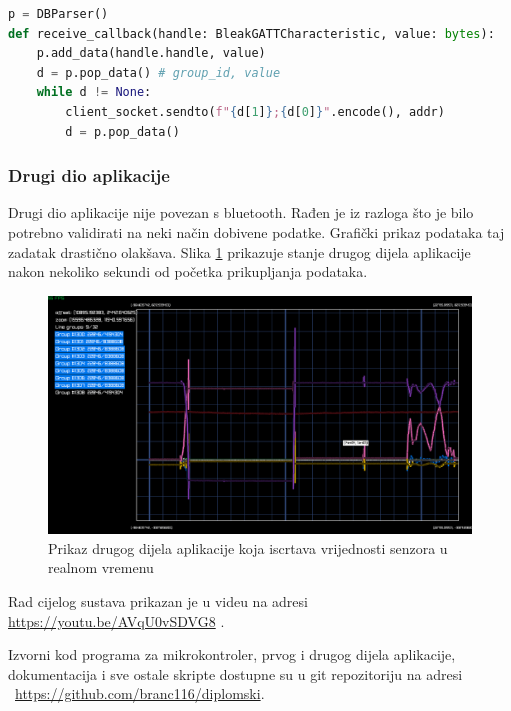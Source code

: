 \documentclass[times, utf8, diplomski]{diplomski}
\begin{document}
\begin{lstlisting}[language=python, caption={Prosljeđivanje dobivene bluetooth vrijednosti drugom dijelu aplikacije}, label={relay}]
p = DBParser()
def receive_callback(handle: BleakGATTCharacteristic, value: bytes):
    p.add_data(handle.handle, value)
    d = p.pop_data() # group_id, value 
    while d != None:
        client_socket.sendto(f"{d[1]};{d[0]}".encode(), addr)
        d = p.pop_data()
\end{lstlisting}

\subsubsection{Drugi dio aplikacije}
Drugi dio aplikacije nije povezan s bluetooth. Rađen je iz razloga što je bilo potrebno validirati na neki način dobivene podatke. Grafički prikaz podataka taj zadatak drastično olakšava. Slika \ref{fig:graph} prikazuje stanje drugog dijela aplikacije nakon nekoliko sekundi od početka prikupljanja podataka. 

\begin{figure}[H]
\includegraphics[width=\textwidth]{rlplot_allsensors_20230623_120537.png}
\centering
\caption{Prikaz drugog dijela aplikacije koja iscrtava vrijednosti senzora u realnom vremenu}
\label{fig:graph}
\end{figure}

Rad cijelog sustava prikazan je u videu na adresi \url{https://youtu.be/AVqU0vSDVG8} \cite{videodemo}.

Izvorni kod programa za mikrokontroler, prvog i drugog dijela aplikacije, dokumentacija i sve ostale skripte dostupne su u git repozitoriju na adresi \ \url{https://github.com/branc116/diplomski}.

\newpage
\end{document}
